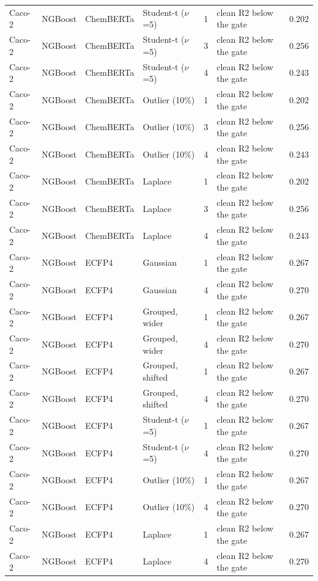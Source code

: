 {\begin{longtable}{llllcll}
Caco-2 & NGBoost & ChemBERTa & Student-t ($\nu$=5) & 1 & clean R2 below the gate & 0.202 \\
Caco-2 & NGBoost & ChemBERTa & Student-t ($\nu$=5) & 3 & clean R2 below the gate & 0.256 \\
Caco-2 & NGBoost & ChemBERTa & Student-t ($\nu$=5) & 4 & clean R2 below the gate & 0.243 \\
Caco-2 & NGBoost & ChemBERTa & Outlier (10\%) & 1 & clean R2 below the gate & 0.202 \\
Caco-2 & NGBoost & ChemBERTa & Outlier (10\%) & 3 & clean R2 below the gate & 0.256 \\
Caco-2 & NGBoost & ChemBERTa & Outlier (10\%) & 4 & clean R2 below the gate & 0.243 \\
Caco-2 & NGBoost & ChemBERTa & Laplace & 1 & clean R2 below the gate & 0.202 \\
Caco-2 & NGBoost & ChemBERTa & Laplace & 3 & clean R2 below the gate & 0.256 \\
Caco-2 & NGBoost & ChemBERTa & Laplace & 4 & clean R2 below the gate & 0.243 \\
Caco-2 & NGBoost & ECFP4 & Gaussian & 1 & clean R2 below the gate & 0.267 \\
Caco-2 & NGBoost & ECFP4 & Gaussian & 4 & clean R2 below the gate & 0.270 \\
Caco-2 & NGBoost & ECFP4 & Grouped, wider & 1 & clean R2 below the gate & 0.267 \\
Caco-2 & NGBoost & ECFP4 & Grouped, wider & 4 & clean R2 below the gate & 0.270 \\
Caco-2 & NGBoost & ECFP4 & Grouped, shifted & 1 & clean R2 below the gate & 0.267 \\
Caco-2 & NGBoost & ECFP4 & Grouped, shifted & 4 & clean R2 below the gate & 0.270 \\
Caco-2 & NGBoost & ECFP4 & Student-t ($\nu$=5) & 1 & clean R2 below the gate & 0.267 \\
Caco-2 & NGBoost & ECFP4 & Student-t ($\nu$=5) & 4 & clean R2 below the gate & 0.270 \\
Caco-2 & NGBoost & ECFP4 & Outlier (10\%) & 1 & clean R2 below the gate & 0.267 \\
Caco-2 & NGBoost & ECFP4 & Outlier (10\%) & 4 & clean R2 below the gate & 0.270 \\
Caco-2 & NGBoost & ECFP4 & Laplace & 1 & clean R2 below the gate & 0.267 \\
Caco-2 & NGBoost & ECFP4 & Laplace & 4 & clean R2 below the gate & 0.270 \\

\end{longtable}}
